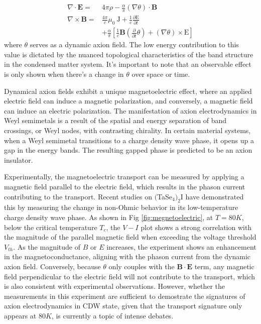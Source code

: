 \begin{equation}
\begin{aligned}
\nabla \cdot \mathbf{E}= & 4 \pi \rho-\frac{\alpha}{\pi}(\nabla \theta) \cdot \mathbf{B} \\
\nabla \times \mathbf{B}= & \frac{4 \pi}{c} \mu_0 \mathrm{~J}+\frac{1}{c} \frac{\partial \mathrm{E}}{\partial t}  \\& +\frac{\alpha}{\pi}\left[\frac{1}{c} \mathbf{B}\left(\frac{\partial}{\partial t} \theta\right)+(\nabla \theta) \times \mathrm{E}\right]
\end{aligned}
\end{equation}
where $\theta$ serves as a dynamic axion field. The low energy contribution to this value is dictated by the nuanced topological characteristics of the band structure in the condensed matter system. It's important to note that an observable effect is only shown when there's a change in $\theta$ over space or time.\cite{nenno2020axion}


Dynamical axion fields exhibit a unique magnetoelectric effect, where an applied electric field can induce a magnetic polarization, and conversely, a magnetic field can induce an electric polarization. The manifestation of axion electrodynamics in Weyl semimetals is a result of the spatial and energy separation of band crossings, or Weyl nodes, with contrasting chirality.\cite{wang2013chiral} In certain material systems, when a Weyl semimetal transitions to a charge density wave phase, it opens up a gap in the energy bands. The resulting gapped phase is predicted to be an axion insulator.\cite{wang2013chiral, wei2012excitonic,laubach2016density,you2016response}

Experimentally, the magnetoelectric transport can be measured by applying a magnetic field parallel to the electric field, which results in the phason current contributing to the transport. Recent studies on $($TaSe$_4)_2$I have demonstrated this by measuring the change in non-Ohmic behavior in its low-temperature charge density wave phase. As shown in Fig \ref{fig:megnetoelectric}, at $T=80K$, below the critical temperature $T_c$, the $V-I$ plot shows a strong correlation with the magnitude of the parallel magnetic field when exceeding the voltage threshold $V_{th}$. As the magnitude of $B$ or $E$ increases, the experiment shows an enhancement in the magnetoconductance, aligning with the phason current from the dynamic axion field. Conversely, because $\theta$ only couples with the $\mathbf{B}\cdot\mathbf{E}$ term, any magnetic field perpendicular to the electric field will not contribute to the transport, which is also consistent with experimental observations\cite{gooth2019axionic}. However, whether the measurements in this experiment are sufficient to demostrate the signatures of axion electrodynamics in CDW state, given that the transport signature only appears at $80K$, is currently a topic of intense debates.\cite{sinchenko2022does}


